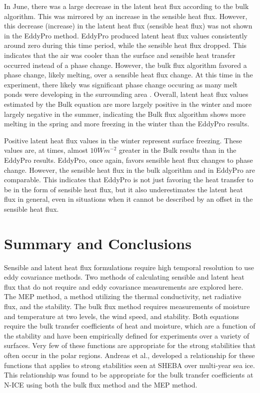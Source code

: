 In June, there was a large decrease in the latent heat flux according to the bulk algorithm. This was mirrored by an increase in the sensible heat flux. However, this decrease (increase) in the latent heat flux (sensible heat flux) was not shown in the EddyPro method. EddyPro produced latent heat flux values consistently around zero during this time period, while the sensible heat flux dropped. This indicates that the air was cooler than the surface and sensible heat transfer occurred instead of a phase change. However, the bulk flux algorithm favored a phase change, likely melting, over a sensible heat flux change. At this time in the experiment, there likely was significant phase change occuring as many melt ponds were developing in the surrounding area \cite{walden:2017}. Overall, latent heat flux values estimated by the Bulk equation are more largely positive in the winter and more largely negative in the summer, indicating the Bulk flux algorithm shows more melting in the spring and more freezing in the winter than the EddyPro results. 

Positive latent heat flux values in the winter represent surface freezing. These values are, at times, almost $10 Wm^{-2}$ greater in the Bulk results than in the EddyPro results. EddyPro, once again, favors sensible heat flux changes to phase change. However, the sensible heat flux in the bulk algorithm and in EddyPro are comparable. This indicates that EddyPro is not just favoring the heat transfer to be in the form of sensible heat flux, but it also underestimates the latent heat flux in general, even in situations when it cannot be described by an offset in the sensible heat flux. 



\section{Summary and Conclusions}
Sensible and latent heat flux formulations require high temporal resolution to use eddy covariance methods. Two methods of calculating sensible and latent heat flux that do not require and eddy covariance measurements are explored here. The MEP method, a method utilizing the thermal conductivity, net radiative flux, and  the stability. The bulk flux method requires measurements of moisture and temperature at two levels, the wind speed, and stability. Both equations require the bulk transfer coefficients of heat and moisture, which are a function of the stability and have been empirically defined for experiments over a variety of surfaces. Very few of these functions are appropriate for the strong stabilities that often occur in the polar regions. Andreas et al., \cite{andreas:311} developed a relationship for these functions that applies to strong stabilities seen at SHEBA over multi-year sea ice. This relationship was found to be appropriate for the bulk transfer coefficients at N-ICE using both the bulk flux method and the MEP method. 

